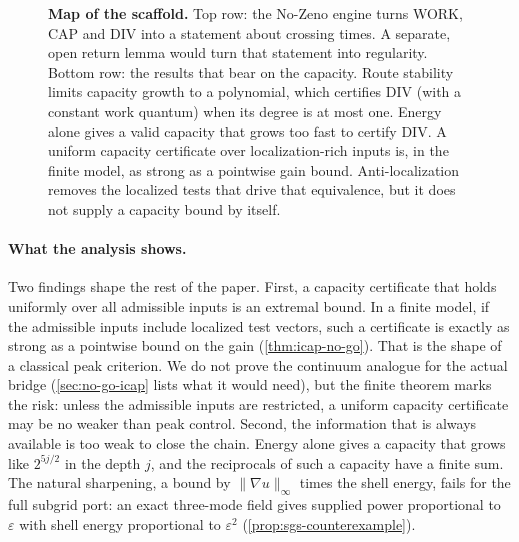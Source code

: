 \begin{figure}[t]
\caption{\textbf{Map of the scaffold.} Top row: the No-Zeno engine turns WORK, CAP and DIV into a
statement about crossing times. A separate, open return lemma would turn that statement into
regularity. Bottom row: the results that bear on the capacity. Route stability limits capacity
growth to a polynomial, which certifies DIV (with a constant work quantum) when its degree is at most one. Energy alone gives a valid capacity that grows too fast to certify DIV. A uniform capacity
certificate over localization-rich inputs is, in the finite model, as strong as a pointwise gain
bound. Anti-localization removes the localized tests that drive that equivalence, but it does not
supply a capacity bound by itself.}
\label{fig:scaffold-map}
\end{figure}

\paragraph{What the analysis shows.}
Two findings shape the rest of the paper. First, a capacity certificate that holds uniformly over
all admissible inputs is an extremal bound. In a finite model, if the admissible inputs include
localized test vectors, such a certificate is exactly as strong as a pointwise bound on the gain
(\cref{thm:icap-no-go}). That is the shape of a classical peak criterion. We do not prove the
continuum analogue for the actual bridge (\cref{sec:no-go-icap} lists what it would need), but the
finite theorem marks the risk: unless the admissible inputs are restricted, a uniform capacity
certificate may be no weaker than peak control.
Second, the information that is always available is too weak to close the chain. Energy alone gives
a capacity that grows like $2^{5j/2}$ in the depth $j$, and the reciprocals of such a capacity have
a finite sum. The natural sharpening, a bound by $\|\nabla u\|_\infty$ times the shell energy, fails for the full subgrid
port: an exact three-mode field gives supplied power proportional to $\varepsilon$ with shell energy
proportional to $\varepsilon^2$ (\cref{prop:sgs-counterexample}).

